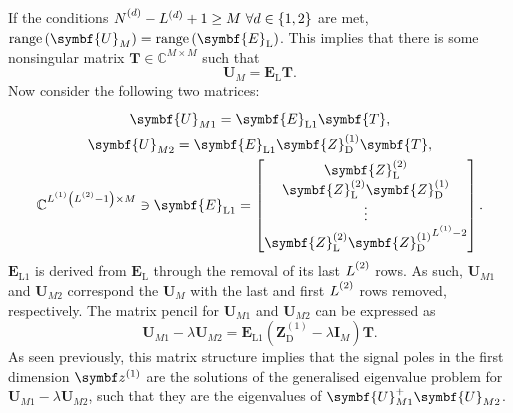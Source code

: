 If the conditions $\Nd - L^{(d)} + 1 \geq M\ \forall d \in \lbrace 1, 2
\rbrace$ are met, $\range\left(\symbf{U}_M\right) =
\range\left(\symbf{E}_{\text{L}}\right)$. This implies that there is some
nonsingular matrix $\symbf{T} \in \mathbb{C}^{M \times M}$ such that
\begin{equation}
    \symbf{U}_M = \symbf{E}_{\text{L}} \symbf{T}.
\end{equation}
Now consider the following two matrices:
\begin{subequations}
    \begin{gather}
        \symbf{U}_{M1} = \symbf{E}^{\vphantom{(1)}}_{\text{L}1} \symbf{T},\\
        \symbf{U}_{M2} = \symbf{E}^{\vphantom{(1)}}_{\text{L}1} \symbf{Z}^{(1)}_{\text{D}} \symbf{T},\\
        \mathbb{C}^{\Lone \left(\Ltwo - 1\right) \times M} \ni
        \symbf{E}_{\text{L}1} =
        \begin{bmatrix}
            \symbf{Z}^{(2)}_{\text{L}} \\
            \symbf{Z}^{(2)}_{\text{L}} \symbf{Z}^{(1)}_{\text{D}} \\
            \vdots \\
            \symbf{Z}^{(2)}_{\text{L}} {\symbf{Z}^{(1)}_{\text{D}}}^{\Lone - 2}
        \end{bmatrix}.
    \end{gather}
\end{subequations}
$\symbf{E}_{\text{L}1}$ is derived from $\symbf{E}_{\text{L}}$ through the
removal of its last $\Ltwo$ rows.
As such, $\symbf{U}_{M1}$ and $\symbf{U}_{M2}$ correspond the $\symbf{U}_M$
with the last and first $\Ltwo$ rows removed, respectively. The matrix pencil
for $\symbf{U}_{M1}$ and $\symbf{U}_{M2}$ can be expressed as
\begin{equation}
    \symbf{U}_{M1} - \lambda \symbf{U}_{M2} =
    \symbf{E}_{\text{L}1} \left( \symbf{Z}^{(1)}_{\text{D}} - \lambda \symbf{I}_M \right) \symbf{T}.
\end{equation}
As seen previously, this matrix structure implies that the signal poles in the
first dimension $\bdzone$ are the solutions of the generalised eigenvalue
problem for $\symbf{U}_{M1} - \lambda \symbf{U}_{M2}$, such that they are
the eigenvalues of $\symbf{U}_{M1}^{+} \symbf{U}_{M2}^{\vphantom{+}}$.

